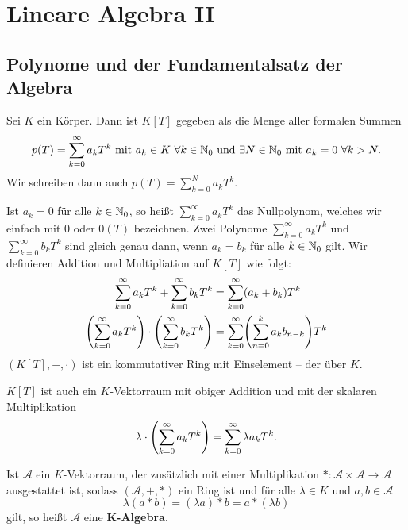 \chapter{Lineare Algebra II} %
\label{cha:2}
\setcounter{section}{0}
\section{Polynome und der Fundamentalsatz der Algebra}
\label{sec:2.1}

\begin{erinnerung}[Polynomring]
	\label{erinnerung:1.1}
	Sei $K$ ein Körper.
	Dann ist $K[T]$ gegeben als die Menge aller formalen Summen
	\[
		p(T) = \sum_{k=0}^{\infty} a_k T^k \text{ mit } a_k \in K \ \forall k \in \mathbb{N}_0 \text{ und } \exists N \in \mathbb{N}_0 \text{ mit } a_k = 0 \ \forall k > N.
	\]
	Wir schreiben dann auch $p(T) = \sum_{k=0}^{N} a_kT^k$.
	
	Ist $a_k=0$ für alle $k \in \mathbb{N}_0$, so heißt $\sum_{k=0}^{\infty} a_kT^k$ das Nullpolynom, welches wir einfach mit $0$ oder $0(T)$ bezeichnen.
	Zwei Polynome $\sum_{k=0}^{\infty} a_kT^k$ und $\sum_{k=0}^{\infty} b_kT^k$ sind gleich genau dann, wenn $a_k = b_k$ für alle $k \in \mathbb{N}_0$ gilt.
	Wir definieren Addition und Multipliation auf $K[T]$ wie folgt:
	\begin{align*}
		\sum_{k=0}^{\infty} a_kT^{k} + \sum_{k=0}^{\infty} b_kT^{k} &= \sum_{k=0}^{\infty} (a_k+b_k)T^{k} \\
		\enb{\sum_{k=0}^{\infty} a_kT^{k}} \cdot \enb{\sum_{k=0}^{\infty} b_kT^{k}} &= \sum_{k=0}^{\infty} \enb{\sum_{n=0}^{k} a_kb_{n-k}} T^{k}
	\end{align*}
	$(K[T],+,\cdot)$ ist ein kommutativer Ring mit Einselement -- der  über $K$.
	
	$K[T]$ ist auch ein $K$-Vektorraum mit obiger Addition und mit der skalaren Multiplikation
	\[
		\lambda \cdot \left(\sum_{k=0}^{\infty} a_kT^{k}\right) = \sum_{k=0}^{\infty} \lambda a_kT^{k}.
	\]
\end{erinnerung}

\begin{bemerkung}
	\label{bem:1.2}
	Ist $\mathcal{A}$ ein $K$-Vektorraum, der zusätzlich mit einer Multiplikation $*\colon \mathcal{A} \times \mathcal{A} \rightarrow \mathcal{A}$ ausgestattet ist, sodass $(\mathcal{A},+,*)$ ein Ring ist und für alle $\lambda \in K$ und $a,b\in \mathcal{A}$
	\[
		\lambda(a*b) = (\lambda a)*b = a * (\lambda b)
	\]
	gilt, so heißt $\mathcal{A}$ eine $\mathbf{K}$\textbf{-Algebra}. 
\end{bemerkung}

